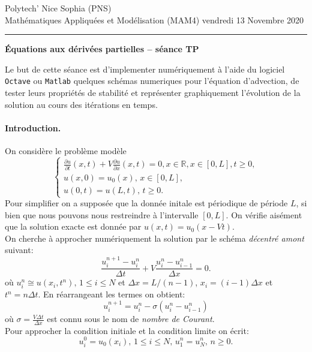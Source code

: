 \documentclass[12pt,a4paper]{article}
\begin{document}
 \hfill Polytech' Nice Sophia (PNS)\\
\noindent Math\'ematiques Appliqu\'ees et Mod\'elisation (MAM4) \hfill vendredi 13 Novembre 2020 \\

\hrule

\medskip

\begin{center}{\bf \'Equations aux d\'eriv\'ees partielles -- séance TP}\end{center}

\medskip


\noindent Le but de cette s\'eance est d'implementer num\'eriquement \`a l'aide
du logiciel \texttt{Octave} ou \texttt{Matlab} quelques sch\'emas numeriques pour l'équation d'advection, de tester
leurs propri\'et\'es de stabilit\'e et repr\'esenter graphiquement
l'\'evolution de la solution au cours des it\'erations en temps.

\paragraph{Introduction.} On consid\`ere le probl\`eme mod\`ele 
$$
\left\{\begin{array}{l}
\displaystyle \frac{\partial u}{\partial t}(x,t)+V\frac{\partial
  u}{\partial x}(x,t)=0,x\in\mathbb{R},x\in[0,L], t\ge 0,\\
\displaystyle u(x,0)=u_0(x),\,x\in [0,L],\\
u(0,t)=u(L,t),\,t\ge 0.
\end{array}\right.
$$
Pour simplifier on a suppos\'ee que la donn\'ee initale
est p\'eriodique de p\'eriode $L$, si bien que nous pouvons nous
restreindre \`a l'intervalle $[0,L]$. On v\'erifie ais\'ement que la
solution exacte est donn\'ee par $u(x,t)=u_0(x-Vt)$.\\

\noindent On cherche \`a approcher num\'eriquement la solution par le sch\'ema {\it décentré amont} suivant:
$$
\frac{u_i^{n+1}-u_i^n}{\Delta t}+V\frac{u_i^n-u_{i-1}^n}{\Delta x}=0.
$$ 
o\`u $u_i^n\cong u(x_i,t^n),\,1\le i\le N$ et $\Delta x=L/(n-1)$,
$x_i=(i-1)\Delta x$ et $t^n = n\Delta t$. En r\'earrangeant les termes
on obtient:
$$
u_i^{n+1}=u_i^n-\sigma(u_i^n-u_{i-1}^n)
$$
o\`u $\sigma=\displaystyle\frac{V\Delta t}{\Delta x}$ est connu sous le nom de {\it nombre de Courant}.\\
Pour approcher la condition initiale et la condition limite on \'ecrit:
$$
u_i^0=u_0(x_i),\,1\le i\le N,\, u_1^n = u_N^n,\,n\ge 0.
$$
\end{document}
